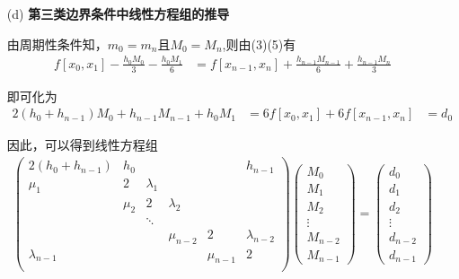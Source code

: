\documentclass[12pt,a4paper,utf8]{ctexart}
\begin{document}
\begin{enumerate}
\begin{itemize}
    \item [(d)] \textbf{第三类边界条件中线性方程组的推导}
    \par
    由周期性条件知，$m_0 = m_n$且$M_0 = M_n$,则由(3)(5)有
    \begin{equation}
      \begin{aligned}
      f[x_0,x_1] - \frac{h_0M_0}{3} - \frac{h_0M_1}{6} &= 
      f[x_{n-1},x_n] + \frac{h_{n-1}M_{n-1}}{6} + \frac{h_{n-1}M_{n}}{3}
      \end{aligned}
    \end{equation}
    \par
    即可化为
    \begin{equation}
      \begin{aligned}
     2(h_0 + h_{n-1})M_0 + h_{n-1}M_{n-1} + h_0M_1 &=   
     6f[x_0,x_1] + 6f[x_{n-1},x_n] &= d_0
      \end{aligned}
    \end{equation}
    \par
    因此，可以得到线性方程组
    \begin{equation}
      \begin{aligned}
      \begin{pmatrix}
      2(h_0 + h_{n-1}) & h_0 & &   &   & h_{n-1} \\ 
      \mu_1 & 2     & \lambda_1 \\
             & \mu_2  & 2   & \lambda_2 \\
              &       & \ddots \\ 
            &     &  &  \mu_{n-2} & 2 & \lambda_{n-2} \\
      \lambda_{n-1}      &     &  &   & \mu_{n-1} & 2 \\
      \end{pmatrix}
      \begin{pmatrix}
        M_0 \\
        M_1 \\
        M_2 \\
        \vdots \\
        M_{n-2} \\
        M_{n-1}
      \end{pmatrix} = 
      \begin{pmatrix}
        d_0 \\
        d_1 \\
        d_2 \\
        \vdots \\
        d_{n-2} \\
        d_{n-1}
      \end{pmatrix}
      \end{aligned}
    \end{equation}


\end{itemize}
\end{enumerate}
\end{document}
